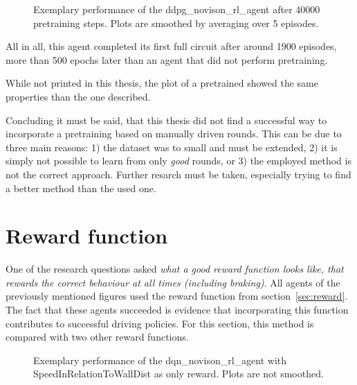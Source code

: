 \begin{figure}[h]
	{%
		\setlength{\fboxsep}{0pt}%
		\setlength{\fboxrule}{1pt}%
	}%
	\centering
	\caption[Exemplary performance of the ddpg\_novison\_rl\_agent after 40000 pretrain steps]{Exemplary performance of the ddpg\_novison\_rl\_agent after 40000 pretraining steps. Plots are smoothed by averaging over 5 episodes.}
	\label{fig:ddpg_incorpPre}
\end{figure}

All in all, this agent completed its first full circuit after around 1900 episodes, more than 500 epochs later than an agent that did not perform pretraining. 

While not printed in this thesis, the plot of a pretrained  showed the same properties than the one described.

Concluding it must be said, that this thesis did not find a successful way to incorporate a pretraining based on manually driven rounds. This can be due to three main reasons: 1) the dataset was to small and must be extended, 2) it is simply not possible to learn from only \textit{good} rounds, or 3) the employed method is not the correct approach. Further resarch must be taken, especially trying to find a better method than the used one.

\section{Reward function}

One of the research questions asked \textit{what a good reward function looks like, that rewards the \textit{correct} behaviour at all times (including braking)}. All agents of the previously mentioned figures used the reward function from section~\ref{sec:reward}. The fact that these agents succeeded is evidence that incorporating this function contributes to successful driving policies. For this section, this method is compared with two other reward functions. 

\begin{figure}[h]
	{%
		\setlength{\fboxsep}{0pt}%
		\setlength{\fboxrule}{1pt}%
	}%
	\centering
	\caption[Exemplary performance of the dqn\_novison\_rl\_agent with SpeedInRelationToWallDist as only reward.]{Exemplary performance of the dqn\_novison\_rl\_agent with SpeedInRelationToWallDist as only reward. Plots are not smoothed.}
	\label{fig:dqnrewardinrelationtowall}
\end{figure}

